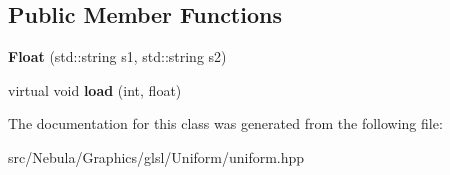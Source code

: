 \subsection*{\-Public \-Member \-Functions}
\begin{DoxyCompactItemize}
\item 
\hypertarget{classNeb_1_1glsl_1_1Uniform_1_1Vector_1_1Float_a79fa9f7bd948d86a054e5ab2bd0f4e40}{{\bfseries \-Float} (std\-::string s1, std\-::string s2)}\label{classNeb_1_1glsl_1_1Uniform_1_1Vector_1_1Float_a79fa9f7bd948d86a054e5ab2bd0f4e40}

\item 
\hypertarget{classNeb_1_1glsl_1_1Uniform_1_1Vector_1_1Float_aebd5e93ba99e30f9901bff30c5d0e81f}{virtual void {\bfseries load} (int, float)}\label{classNeb_1_1glsl_1_1Uniform_1_1Vector_1_1Float_aebd5e93ba99e30f9901bff30c5d0e81f}

\end{DoxyCompactItemize}


\-The documentation for this class was generated from the following file\-:\begin{DoxyCompactItemize}
\item 
src/\-Nebula/\-Graphics/glsl/\-Uniform/uniform.\-hpp\end{DoxyCompactItemize}
